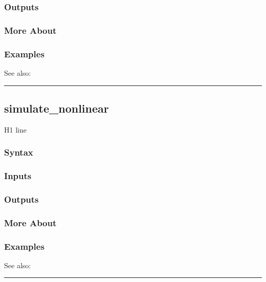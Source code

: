 \documentclass[letterpaper,10pt,english]{sphinxmanual}
\begin{document}
\subsubsection{Outputs}
\label{classes/models/@dsge/dsge:id164}

\subsubsection{More About}
\label{classes/models/@dsge/dsge:id165}

\subsubsection{Examples}
\label{classes/models/@dsge/dsge:id166}
See also:


\bigskip\hrule{}\bigskip



\subsection{simulate\_nonlinear}
\label{classes/models/@dsge/dsge:id167}\label{classes/models/@dsge/dsge:simulate-nonlinear}
H1 line


\subsubsection{Syntax}
\label{classes/models/@dsge/dsge:id168}

\subsubsection{Inputs}
\label{classes/models/@dsge/dsge:id169}

\subsubsection{Outputs}
\label{classes/models/@dsge/dsge:id170}

\subsubsection{More About}
\label{classes/models/@dsge/dsge:id171}

\subsubsection{Examples}
\label{classes/models/@dsge/dsge:id172}
See also:


\bigskip\hrule{}\bigskip
\end{document}

